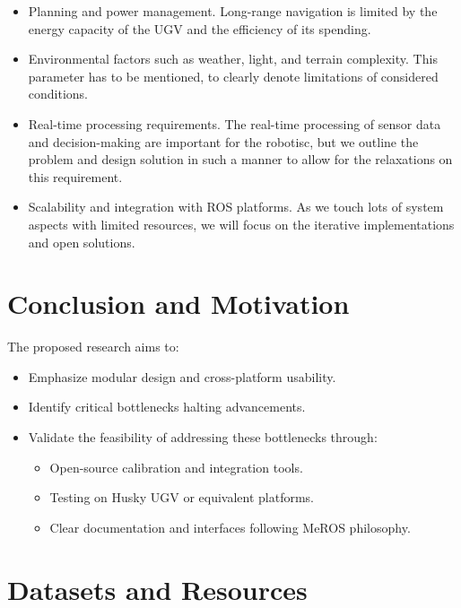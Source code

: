 \documentclass[runningheads]{llncs}
\begin{document}
\begin{itemize}
  \item Planning and power management.
        Long-range navigation is limited by the energy capacity of the UGV and the efficiency of its spending.
  \item Environmental factors such as weather, light, and terrain complexity.
        This parameter has to be mentioned, to clearly denote limitations of considered conditions.
  \item Real-time processing requirements.
        The real-time processing of sensor data and decision-making are important for the robotisc, but we outline the problem and design solution in such a manner to allow for the relaxations on this requirement.
  \item Scalability and integration with ROS platforms.
        As we touch lots of system aspects with limited resources, we will focus on the iterative implementations and open solutions.
\end{itemize}

\section{Conclusion and Motivation}
The proposed research aims to:
\begin{itemize}
  \item Emphasize modular design and cross-platform usability.
  \item Identify critical bottlenecks halting advancements.
  \item Validate the feasibility of addressing these bottlenecks through:
        \begin{itemize}
          \item Open-source calibration and integration tools.
          \item Testing on Husky UGV or equivalent platforms.
          \item Clear documentation and interfaces following MeROS philosophy.
        \end{itemize}
\end{itemize}

\section{Datasets and Resources}
\end{document}
